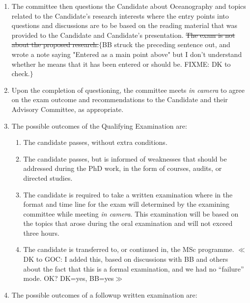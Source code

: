 \documentclass[12pt]{article}
\newcommand{\fixme}[1]{\color{fixmeColor}$\{$#1$\}$\color{black}\index{$>>>>$FIXME$<<<<$}}
\newcommand{\vote}[1]{\color{voteColor}$\ll$#1$\gg$\color{black}\marginpar[$\gg$ vote]{$\ll$ vote}\index{$>>>>$VOTE$<<<<$}}
\newcommand{\advcom}{\color{diColor}Advisory Committee\color{black}\index{Committees!Advisory}\xspace}
\begin{document}
\begin{enumerate}
    \item The committee then questions the Candidate about Oceanography and
        topics related to the Candidate's research interests where the entry
        points into questions and discussions are to be based on the reading
        material that was provided to the Candidate and Candidate's
        presentation. \sout{The exam is not about the proposed
        research.}\fixme{BB struck the preceding sentence out, and wrote a note
        saying "Entered as a main point above" but I don't understand whether
        he means that it has been entered or should be. FIXME: DK to check.}

    \item Upon the completion of questioning, the committee meets \emph{in
        camera} to agree on the exam outcome and recommendations to the
        Candidate and their \advcom, as appropriate.

    \item The possible outcomes of the Qualifying Examination are:

        \begin{enumerate}
            \item The candidate passes, without extra conditions.

            \item The candidate passes, but is informed of weaknesses that
                should be addressed during the PhD work, in the form of
                courses, audits, or directed studies.

            \item The candidate is required to take a written examination where
                in the format and time line for the exam will determined by the
                examining committee while meeting \emph{in camera}. This
                examination will be based on the topics that arose during the
                oral examination and will not exceed three hours. 
                

            \item The candidate is transferred to, or continued in, the MSc
                programme.  \vote{DK to GOC: I added this, based on discussions
                with BB and others about the fact that this is a formal
                examination, and we had no ``failure'' mode.  OK? DK=yes,
                BB=yes}

        \end{enumerate}

    \item The possible outcomes of a followup written examination are:


\end{enumerate}
\end{document}
